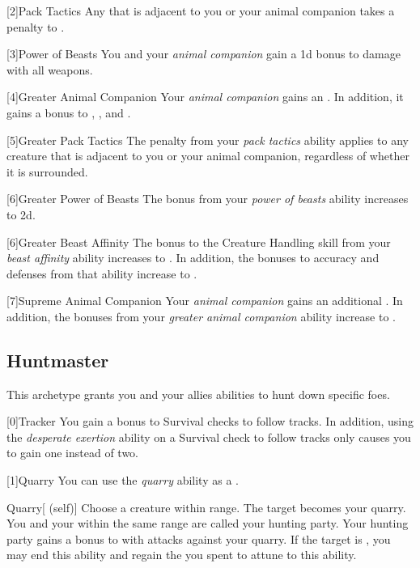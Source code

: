         [2]{Pack Tactics} Any   that is adjacent to you or your animal companion takes a  penalty to .

        [3]{Power of Beasts} You and your \textit{animal companion} gain a \plus1d bonus to damage with all weapons.

        [4]{Greater Animal Companion} Your \textit{animal companion} gains an .
        In addition, it gains a  bonus to , , and .

        [5]{Greater Pack Tactics} The penalty from your \textit{pack tactics} ability applies to any creature that is adjacent to you or your animal companion, regardless of whether it is surrounded.

        [6]{Greater Power of Beasts} The bonus from your \textit{power of beasts} ability increases to \plus2d.

        [6]{Greater Beast Affinity} The bonus to the Creature Handling skill from your \textit{beast affinity} ability increases to .
        In addition, the bonuses to accuracy and defenses from that ability increase to .

        [7]{Supreme Animal Companion} Your \textit{animal companion} gains an additional .
        In addition, the bonuses from your \textit{greater animal companion} ability increase to .

    \newpage
    \subsection{Huntmaster}
        This archetype grants you and your allies abilities to hunt down specific foes.

        [0]{Tracker} You gain a  bonus to Survival checks to follow tracks.
        In addition, using the \textit{desperate exertion} ability on a Survival check to follow tracks only causes you to gain one  instead of two.

        [1]{Quarry}\label{Quarry} You can use the \textit{quarry} ability as a .
        \begin{attuneability}{Quarry}[ (self)]
            Choose a creature within \rnglong range.
            The target becomes your quarry.
            You and your  within the same range are called your hunting party.
            Your hunting party gains a  bonus to  with  attacks against your quarry.
            If the target is , you may end this ability and regain the  you spent to attune to this ability.
        \end{attuneability}

